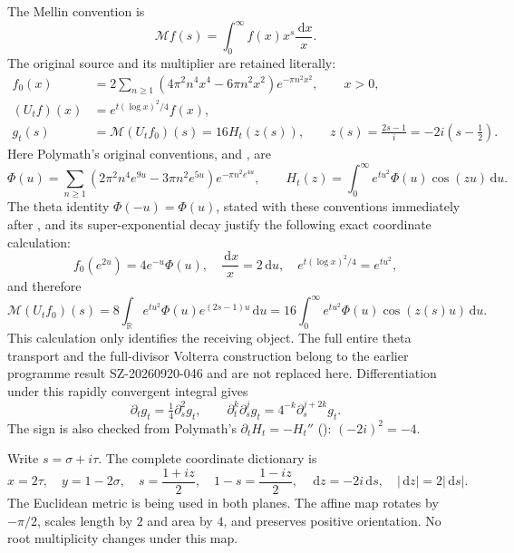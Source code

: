 \documentclass[11pt]{article}
\newcommand{\R}{\mathbb R}
\newcommand{\Mell}{\mathcal M}
\newcommand{\dd}{\,\mathrm d}
\newcommand{\Src}[1]{\cite[original TeX label \texttt{#1}]{polymath}}
\begin{document}
The Mellin convention is
\[
 \Mell f(s)=\int_0^\infty f(x)x^s\frac{\dd x}{x}.
\]
The original source and its multiplier are retained literally:
\begin{equation}\label{PMH1-objects}
\begin{split}
 f_0(x)&=2\sum_{n\ge1}
 (4\pi^2n^4x^4-6\pi n^2x^2)e^{-\pi n^2x^2},\qquad x>0,\\
 (U_tf)(x)&=e^{t(\log x)^2/4}f(x),\\
 g_t(s)&=\Mell(U_tf_0)(s)=16H_t(z(s)),\qquad
 z(s)=\frac{2s-1}{i}=-2i(s-\tfrac12).
\end{split}
\end{equation}
Here Polymath's original conventions, \Src{phidef} and \Src{htdef}, are
\begin{equation}\label{PMH1-Phi}
 \Phi(u)=\sum_{n\ge1}(2\pi^2n^4e^{9u}-3\pi n^2e^{5u})
 e^{-\pi n^2e^{4u}},\qquad
 H_t(z)=\int_0^\infty e^{tu^2}\Phi(u)\cos(zu)\dd u.
\end{equation}
The theta identity $\Phi(-u)=\Phi(u)$, stated with these conventions
immediately after \Src{phidef}, and its super-exponential decay justify
the following exact coordinate calculation:
\[
 f_0(e^{2u})=4e^{-u}\Phi(u),\quad
 \frac{\dd x}{x}=2\dd u,\quad
 e^{t(\log x)^2/4}=e^{tu^2},
\]
and therefore
\[
 \Mell(U_tf_0)(s)
 =8\int_\R e^{tu^2}\Phi(u)e^{(2s-1)u}\dd u
 =16\int_0^\infty e^{tu^2}\Phi(u)\cos(z(s)u)\dd u.
\]
This calculation only identifies the receiving object. The full entire
theta transport and the full-divisor Volterra construction belong to
the earlier programme result SZ-20260920-046 and are not replaced here.
Differentiation under this rapidly convergent integral gives
\begin{equation}\label{PMH1-heat}
 \partial_tg_t=\tfrac14\partial_s^2g_t,
 \qquad \partial_t^k\partial_s^jg_t
 =4^{-k}\partial_s^{j+2k}g_t.
\end{equation}
The sign is also checked from Polymath's $\partial_tH_t=-H_t''$
(\Src{back}): $(-2i)^2=-4$.

Write $s=\sigma+i\tau$. The complete coordinate dictionary is
\begin{equation}\label{PMH1-coordinate}
 x=2\tau,\quad y=1-2\sigma,\quad
 s=\frac{1+iz}{2},\quad 1-s=\frac{1-iz}{2},\quad
 \dd z=-2i\dd s,\quad |\dd z|=2|\dd s|.
\end{equation}
The Euclidean metric is being used in both planes. The affine map
rotates by $-\pi/2$, scales length by $2$ and area by $4$, and preserves
positive orientation. No root multiplicity changes under this map.
\end{document}
